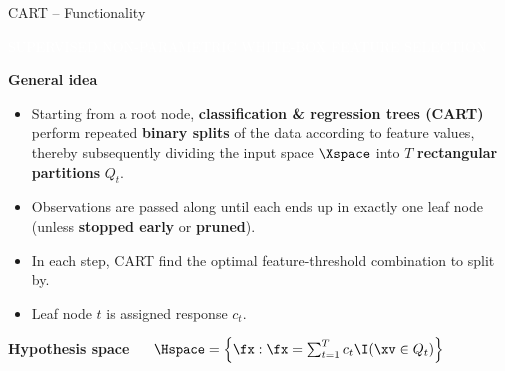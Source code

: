\documentclass[11pt,compress,t,notes=noshow, xcolor=table]{beamer}
\newcommand{\maketag}[1]{\colorbox{highlightcol}{\textcolor{white}
{\MakeUppercase{#1}}}}
\newcommand{\highlight}[1]{\textcolor{highlightcol}{\textbf{#1}}}
\begin{document}
\begin{frame}{CART -- Functionality}

\footnotesize

\maketag{Supervised}
\maketag{Non-parametric}
\maketag{White-box}
\maketag{Feature selection}

\medskip

\highlight{General idea}
\begin{itemize}
  \item Starting from a root node, \textbf{classification \& regression trees 
  (CART)} perform repeated \textbf{binary splits} of the data according to feature 
  values, thereby subsequently dividing the input space $\Xspace$ into $T$ 
  \textbf{rectangular partitions} $Q_t$.
  \item Observations are passed along until each ends up in exactly one leaf 
  node (unless \textbf{stopped early} or \textbf{pruned}).
  \item In each step, CART find the optimal feature-threshold combination to 
  split by.
  \item Leaf node $t$ is assigned response $c_t$.
\end{itemize}

\medskip
 
\highlight{Hypothesis space} ~~
$\Hspace = \left\{ \fx: \fx = \sum_{t = 1}^T c_t \I(\xv \in Q_t) 
\right\}$

\medskip


\end{frame}
\end{document}
